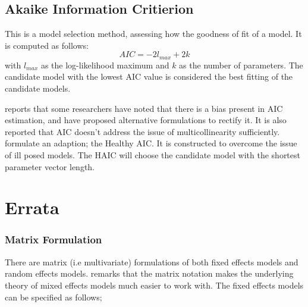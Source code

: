 \documentclass[12pt, a4paper]{report}
\theoremstyle{plain}
\theoremstyle{definition}
\theoremstyle{remark}
\begin{document}


%
%

\section{Akaike Information Critierion}
This is a model selection method, assessing how the goodness of
fit of a model. It is computed as follows:
\begin{displaymath}
AIC = -2l_{max}+ 2k
\end{displaymath}
with $l_{max}$ as the log-likelihood maximum and $k$ as the number
of parameters. The candidate model with the lowest AIC value is
considered the best fitting of the candidate models.

\citet[p.13]{Demi} reports that some researchers have noted that
there is a bias present in AIC estimation, and have proposed
alternative formulations to rectify it. It is also reported that
AIC doesn't address the issue of multicollinearity sufficiently.
\citet{Demi} formulate an adaption; the Healthy AIC. It is
constructed to overcome the issue of ill posed models. The HAIC
will choose the candidate model with the shortest parameter vector
length.


\chapter{Errata}








\subsection{Matrix Formulation} There are matrix (i.e multivariate)
formulations of both fixed effects models and random effects
models. \citet{BrownPrescott} remarks that the matrix notation
makes the underlying theory of mixed effects models much easier to
work with. The fixed effects models can be specified as follows;
\end{document}
